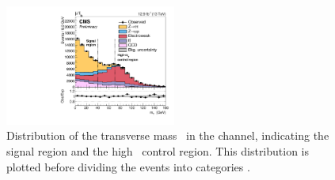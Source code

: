 \begin{figure}[h!]
\begin{center}
\includegraphics[width=0.5\textwidth]{./MSSM/Figures/CMS-PAS-HIG-16-037_Figure_002.pdf}
\end{center}
\caption{Distribution of the transverse mass \mT~in the \mutau channel, indicating
the signal region and the high \mT~control region. This distribution is plotted
before dividing the events into categories \cite{CMS-PAS-HIG-16-037}.}
\label{fig:mssm_bkgs_wjets_mutau_mt}
\end{figure}

